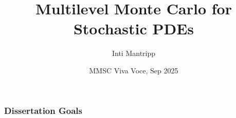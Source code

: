 \documentclass[aspectratio=169]{beamer}
\title[Multilevel Monte Carlo for SPDEs] %
{Multilevel Monte Carlo for Stochastic PDEs} %
\author{Inti Mantripp}
\institute{Mathematical Institute\\University of Oxford}
\date[17 Sep 2025]  %
{MMSC Viva Voce, Sep 2025} %
\begin{document}
\begin{frame}[plain]
  \titlepage
\end{frame}

\begin{frame}
  \frametitle{Dissertation Goals}
  
\end{frame}







% 
\end{document}
